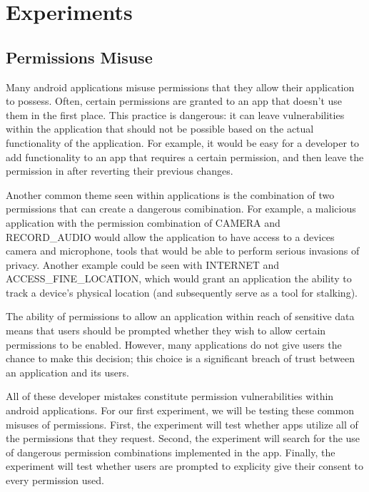 \section{Experiments}
\label{sec:design}

    \subsection{Permissions Misuse}
    
        Many android applications misuse permissions that they
        allow their application to possess. Often, certain
        permissions are granted to an app that doesn't use them
        in the first place. This practice is dangerous: it can 
        leave vulnerabilities within the application that should
        not be possible based on the actual functionality of the
        application. For example, it would be easy for a 
        developer to add functionality to an app that requires a
        certain permission, and then leave the permission in after
        reverting their previous changes. 
        
        Another common theme seen within applications
        is the combination of two permissions that can create a 
        dangerous comibination. For example, a malicious 
        application with the permission combination of
        CAMERA and RECORD\_AUDIO would allow the application
        to have access to a devices camera and microphone, tools
        that would be able to perform serious invasions of privacy. 
        Another example could be seen with INTERNET and 
        ACCESS\_FINE\_LOCATION, which would grant an application the
        ability to track a device's physical location (and 
        subsequently serve as a tool for stalking).

        The ability of permissions to allow an application within
        reach of sensitive data means that users should be prompted
        whether they wish to allow certain permissions to be enabled.
        However, many applications do not give users the chance to 
        make this decision; this choice is a significant breach of trust 
        between an application and its users.

        All of these developer mistakes constitute permission vulnerabilities
        within android applications. For our first experiment, we
        will be testing these common misuses of permissions. First, 
        the experiment will test whether apps utilize all of the
        permissions that they request. Second, the experiment will 
        search for the use of dangerous permission combinations
        implemented in the app. Finally, the experiment will test whether
        users are prompted to explicity give their consent to every
        permission used.
        
